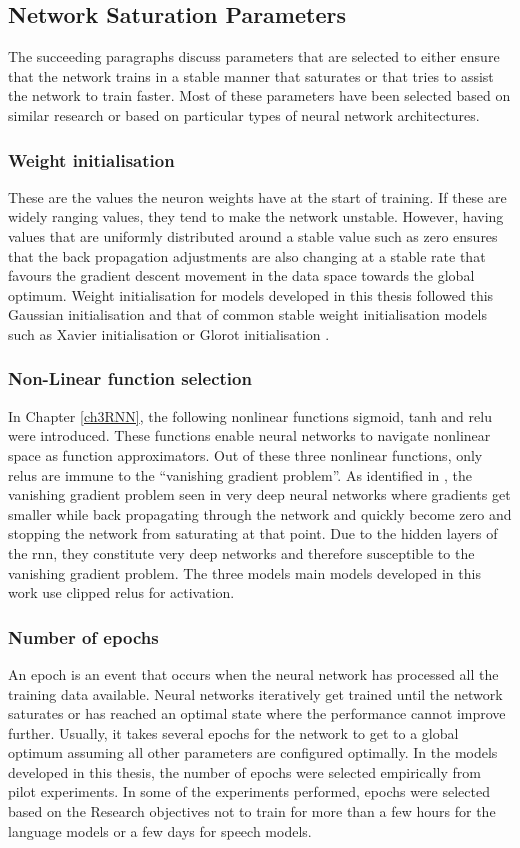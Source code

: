 \subsection{Network Saturation Parameters}
The succeeding paragraphs discuss parameters that are selected to either ensure that the network trains in a stable manner that saturates or that tries to assist the network to train faster.  Most of these parameters have been selected based on similar research or based on particular types of neural network architectures.
\subsubsection{Weight initialisation} 
These are the values the neuron weights have at the start of training.  If these are  widely ranging values, they tend to make the network unstable.  However, having values that are uniformly distributed around a stable value such as zero ensures that the back propagation adjustments are also changing at a stable rate that favours the gradient descent movement in the data space towards the global optimum. Weight initialisation for models developed in this thesis followed this Gaussian initialisation and that of common stable weight initialisation models such as Xavier initialisation \citep{kumar2017weight} or Glorot initialisation \citep{glorot2010understanding} .
\subsubsection{Non-Linear function selection}
In Chapter \ref{ch3RNN}, the following nonlinear functions sigmoid, tanh and \acrshort{relu} were introduced.  These functions enable neural networks to navigate nonlinear space as function approximators.  Out of these three nonlinear functions, only \acrshort{relu}s \citep{he2015delving} are immune to the “vanishing gradient problem”.  As identified in \cite{glorot2010understanding}, the vanishing gradient problem seen in very deep neural networks where gradients get smaller while back propagating through the network and quickly become zero and stopping the network from saturating at that point. Due to the hidden layers of the \acrshort{rnn}, they constitute very deep networks and therefore susceptible to the vanishing gradient problem.  The three models main models developed in this work use clipped \acrshort{relu}s for activation.
\subsubsection{Number of epochs}
An epoch is an event that occurs when the neural network has processed all the training data available.  Neural networks iteratively get trained until the network saturates or has reached an optimal state where the performance cannot improve further.  Usually, it takes several epochs for the network to get to a global optimum assuming all other parameters are configured optimally.  In the models developed in this thesis, the number of epochs were selected empirically from pilot experiments.  In some of the experiments performed, epochs were selected based on the Research objectives not to train for more than a few hours for the language models or a few days for speech models.
